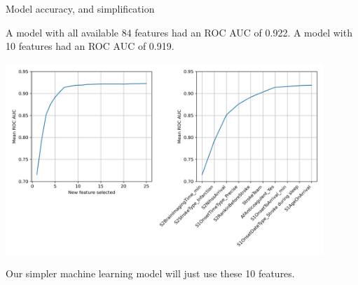 \begin{frame}{Model accuracy, and simplification}

A model with all available 84 features had an ROC AUC of 0.922. A model with 10 features had an ROC AUC of 0.919.

\begin{center}
\includegraphics[width=0.9\textwidth]{./images/01_feature_selection.jpg}
\end{center}

Our simpler machine learning model will just use these 10 features.

\end{frame}